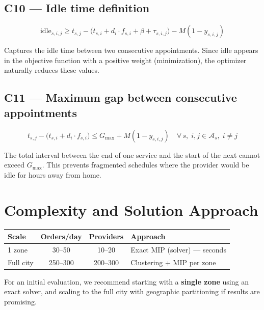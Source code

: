 \documentclass[11pt,a4paper]{article}
\begin{document}
\subsection{C10 --- Idle time definition}

\begin{equation}
\text{idle}_{s,i,j} \geq t_{s,j} - \big(t_{s,i} + d_i \cdot f_{s,i} + \beta + \tau_{s,i,j}\big) - M(1 - y_{s,i,j})
\end{equation}

Captures the idle time between two consecutive appointments. Since idle appears in the objective function with a positive weight (minimization), the optimizer naturally reduces these values.

\subsection{C11 --- Maximum gap between consecutive appointments}

\begin{equation}
t_{s,j} - \big(t_{s,i} + d_i \cdot f_{s,i}\big) \leq G_{\max} + M(1 - y_{s,i,j}) \quad \forall\, s,\; i,j \in \mathcal{A}_s,\; i \neq j
\end{equation}

The total interval between the end of one service and the start of the next cannot exceed $G_{\max}$. This prevents fragmented schedules where the provider would be idle for hours away from home.

\section{Complexity and Solution Approach}

\renewcommand{\arraystretch}{1.3}
\begin{tabular}{@{}lccl@{}}
\toprule
\textbf{Scale} & \textbf{Orders/day} & \textbf{Providers} & \textbf{Approach} \\
\midrule
1 zone & 30--50 & 10--20 & Exact MIP (solver) --- seconds \\
Full city & 250--300 & 200--300 & Clustering + MIP per zone \\
\bottomrule
\end{tabular}

\vspace{6pt}
For an initial evaluation, we recommend starting with a \textbf{single zone} using an exact solver, and scaling to the full city with geographic partitioning if results are promising.
\end{document}
